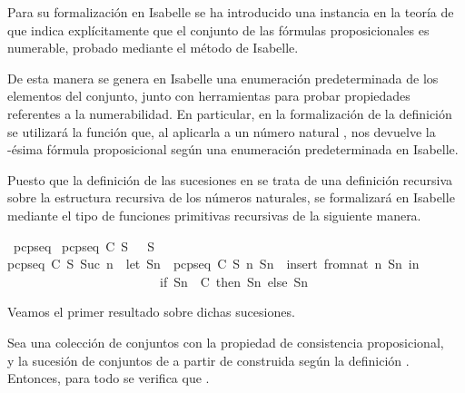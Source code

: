 \begin{isabellebody}
\begin{isamarkuptext}
  Para su formalización en Isabelle se ha introducido una instancia en la teoría de  que 
  indica explícitamente que el conjunto de las fórmulas proposicionales es numerable, probado
  mediante el método  de Isabelle.


  De esta manera se genera en Isabelle una enumeración predeterminada de los elementos del conjunto,
  junto con herramientas para probar propiedades referentes a la numerabilidad. En particular, en la 
  formalización de la definición  se utilizará la función  que, al aplicarla a un 
  número natural , nos devuelve la -ésima fórmula proposicional según una enumeración 
  predeterminada en Isabelle. 

  Puesto que la definición de las sucesiones en  se trata de una definición 
  recursiva sobre la estructura recursiva de los números naturales, se formalizará en Isabelle
  mediante el tipo de funciones primitivas recursivas de la siguiente manera.%
\end{isamarkuptext}\isamarkuptrue%
\isamarkupfalse%
\ pcp{\isacharunderscore}seq\ \isanewline
{\isachardoublequoteopen}pcp{\isacharunderscore}seq\ C\ S\ {}\ {\isacharequal}\ S{\isachardoublequoteclose}\ {\isacharbar}\isanewline
{\isachardoublequoteopen}pcp{\isacharunderscore}seq\ C\ S\ {\isacharparenleft}Suc\ n{\isacharparenright}\ {\isacharequal}\ {\isacharparenleft}let\ Sn\ {\isacharequal}\ pcp{\isacharunderscore}seq\ C\ S\ n{\isacharsemicolon}\ Sn{}\ {\isacharequal}\ insert\ {\isacharparenleft}from{\isacharunderscore}nat\ n{\isacharparenright}\ Sn\ in\isanewline
\ \ \ \ \ \ \ \ \ \ \ \ \ \ \ \ \ \ \ \ \ \ \ \ if\ Sn{}\ {\isasymin}\ C\ then\ Sn{}\ else\ Sn{\isacharparenright}{\isachardoublequoteclose}%
\begin{isamarkuptext}%
Veamos el primer resultado sobre dichas sucesiones.

  \begin{lema}
    Sea  una colección de conjuntos con la propiedad de consistencia proposicional,\\  y 
     la sucesión de conjuntos de  a partir de  construida según la definición . 
    Entonces, para todo  se verifica que .
  \end{lema}


\end{isamarkuptext}
\end{isabellebody}
